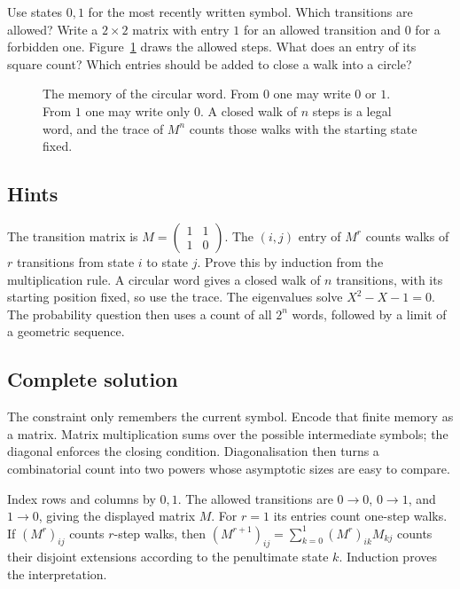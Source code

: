 \begin{think}
Use states $0,1$ for the most recently written symbol. Which transitions are
allowed? Write a $2\times2$ matrix with entry $1$ for an allowed transition and
$0$ for a forbidden one. Figure~\ref{fig:field-transitions} draws the allowed steps. What does an entry of its square count? Which entries
should be added to close a walk into a circle?
\end{think}

\begin{figure}[ht]
\centering
{}
\caption{The memory of the circular word. From $0$ one may write $0$ or $1$. From $1$ one may write only $0$. A closed walk of $n$ steps is a legal word, and the trace of $M^n$ counts those walks with the starting state fixed.}
\label{fig:field-transitions}
\end{figure}

\subsection*{Hints}
The transition matrix is $M=\left(\begin{smallmatrix}1&1\\1&0\end{smallmatrix}\right)$.
The $(i,j)$ entry of $M^r$ counts walks of $r$ transitions from state $i$ to state
$j$. Prove this by induction from the multiplication rule. A circular word gives
a closed walk of $n$ transitions, with its starting position fixed, so use the
trace. The eigenvalues solve $X^2-X-1=0$. The probability question then uses a
count of all $2^n$ words, followed by a limit of a geometric sequence.

\subsection*{Complete solution}
\idea The constraint only remembers the current symbol. Encode that finite memory
as a matrix. Matrix multiplication sums over the possible intermediate symbols;
the diagonal enforces the closing condition. Diagonalisation then turns a
combinatorial count into two powers whose asymptotic sizes are easy to compare.

\writeup Index rows and columns by $0,1$. The allowed transitions are $0\to0$,
$0\to1$, and $1\to0$, giving the displayed matrix $M$. For $r=1$ its entries
count one-step walks. If $(M^r)_{ij}$ counts $r$-step walks, then
$(M^{r+1})_{ij}=\sum_{k=0}^1(M^r)_{ik}M_{kj}$ counts their disjoint extensions
according to the penultimate state $k$. Induction proves the interpretation.


